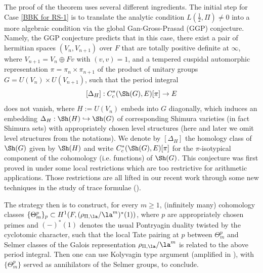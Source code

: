 \documentclass[11pt]{amsart}
\theoremstyle{definition}
\theoremstyle{definition}
\theoremstyle{definition}
\numberwithin{equation}{section}
\begin{document}
The proof of the theorem uses several different ingredients. The initial step for Case \eqref{BBK for RS-1} is to translate the analytic condition $L(\frac{1}{2},\Pi)\neq 0$ into a more algebraic condition via the global Gan-Gross-Prasad (GGP) conjecture. Namely, the GGP conjecture predicts that in this case, there exist a pair of hermitian spaces $(V_n,V_{n+1})$ over $F$  that are totally positive definite at $\infty$, where $V_{n+1}=V_n\oplus Fv$ with $(v,v)=1$, and a
tempered cuspidal automorphic representation $\pi=\pi_n\times \pi_{n+1}$ of the product of unitary groups $G=U(V_n)\times U(V_{n+1})$, such that the period integral 
\[
[\Delta_H]: C^*_c(\Sh(G),E)[\pi]\to E
\]
does not vanish, where $H:=U(V_n)$ embeds into $G$ diagonally, which induces an embedding $\Delta_H: \Sh(H)\hookrightarrow \Sh(G)$ of corresponding Shimura varieties (in fact Shimura sets) with appropriately chosen level structures (here and later we omit level structures from the notations). We denote by $[\Delta_H]$ the homology class of $\Sh(G)$ given by $\Sh(H)$ and write $C^*_c(\Sh(G),E)[\pi]$ for the $\pi$-isotypical component of the cohomology (i.e. functions) of $\Sh(G)$. 
This conjecture was first proved in \cite{Zhang-GGP}
under some local restrictions which are too restrictive for arithmetic applications. Those restrictions are all lifted in our recent work through some new techniques in the study of trace formulae (\cite{BLZZ-GGP}). 

The strategy then is to construct, for every $m\geq 1$, (infinitely many) cohomology classes $\{\Theta_m^p\}_p\subset H^1(F, (\rho_{\Pi,\la}/\la^m)^*(1))$, where $p$ are appropriately chosen primes and $(-)^*(1)$ denotes the usual Pontryagin duality twisted by the cyclotomic character, such that the local Tate pairing at $p$ between $\Theta_m^p$ and Selmer classes of the Galois representation $\rho_{\Pi,\la}/\la^m$  is related to the above period integral. Then one can use Kolyvagin type argument (amplified in \cite{Liu-HZ-Cycle, LTXZZ-BBK}), with  $\{\Theta_m^p\}$ served as annihilators of the Selmer groups, to conclude.
\end{document}
